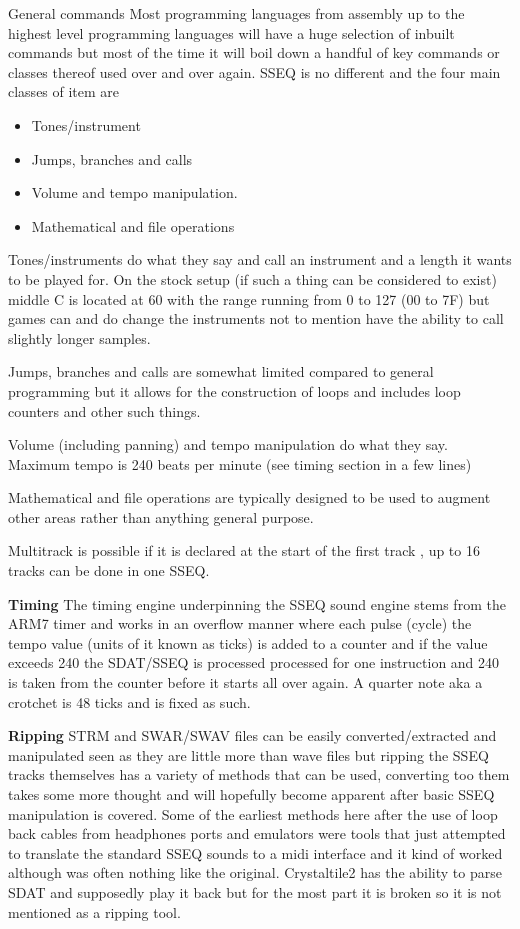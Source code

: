 \documentclass[
]{book}
\providecommand{\tightlist}{%
  \setlength{\itemsep}{0pt}\setlength{\parskip}{0pt}}
\begin{document}
General commands Most programming languages from assembly up to the highest level programming languages will have a huge selection of inbuilt commands but most of the time it will boil down a handful of key commands or classes thereof used over and over again. SSEQ is no different and the four main classes of item are

\begin{itemize}
\tightlist
\item
  Tones/instrument
\item
  Jumps, branches and calls
\item
  Volume and tempo manipulation.
\item
  Mathematical and file operations
\end{itemize}

Tones/instruments do what they say and call an instrument and a length it wants to be played for. On the stock setup (if such a thing can be considered to exist) middle C is located at 60 with the range running from 0 to 127 (00 to 7F) but games can and do change the instruments not to mention have the ability to call slightly longer samples.

Jumps, branches and calls are somewhat limited compared to general programming but it allows for the construction of loops and includes loop counters and other such things.

Volume (including panning) and tempo manipulation do what they say. Maximum tempo is 240 beats per minute (see timing section in a few lines)

Mathematical and file operations are typically designed to be used to augment other areas rather than anything general purpose.

Multitrack is possible if it is declared at the start of the first track , up to 16 tracks can be done in one SSEQ.

\textbf{Timing} The timing engine underpinning the SSEQ sound engine stems from the ARM7 timer and works in an overflow manner where each pulse (cycle) the tempo value (units of it known as ticks) is added to a counter and if the value exceeds 240 the SDAT/SSEQ is processed processed for one instruction and 240 is taken from the counter before it starts all over again. A quarter note aka a crotchet is 48 ticks and is fixed as such.

\textbf{Ripping} STRM and SWAR/SWAV files can be easily converted/extracted and manipulated seen as they are little more than wave files but ripping the SSEQ tracks themselves has a variety of methods that can be used, converting too them takes some more thought and will hopefully become apparent after basic SSEQ manipulation is covered. Some of the earliest methods here after the use of loop back cables from headphones ports and emulators were tools that just attempted to translate the standard SSEQ sounds to a midi interface and it kind of worked although was often nothing like the original. Crystaltile2 has the ability to parse SDAT and supposedly play it back but for the most part it is broken so it is not mentioned as a ripping tool.
\end{document}
